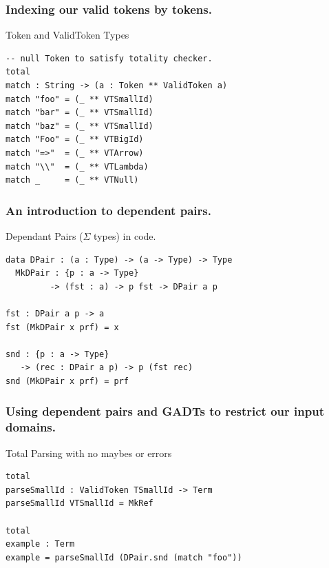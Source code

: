 \documentclass
  [hyperref={colorlinks = true,linkcolor = blue, 
             citecolor = blue, urlcolor = blue}
  ]{beamer}
\begin{document}
\begin{frame}[fragile]
\frametitle{Indexing our valid tokens by tokens.}
\begin{block}{Token and ValidToken Types}
\begin{verbatim}
-- null Token to satisfy totality checker.
total
match : String -> (a : Token ** ValidToken a)
match "foo" = (_ ** VTSmallId)
match "bar" = (_ ** VTSmallId)
match "baz" = (_ ** VTSmallId)
match "Foo" = (_ ** VTBigId)
match "=>"  = (_ ** VTArrow)
match "\\"  = (_ ** VTLambda)
match _     = (_ ** VTNull)
\end{verbatim}
\end{block}
\end{frame}

\begin{frame}[fragile]
\frametitle{An introduction to dependent pairs.}
\begin{block}{Dependant Pairs ($\Sigma$ types) in code.}
\begin{verbatim}
data DPair : (a : Type) -> (a -> Type) -> Type
  MkDPair : {p : a -> Type}
         -> (fst : a) -> p fst -> DPair a p

fst : DPair a p -> a
fst (MkDPair x prf) = x

snd : {p : a -> Type}
   -> (rec : DPair a p) -> p (fst rec)
snd (MkDPair x prf) = prf
\end{verbatim}
\end{block}
\end{frame}

\begin{frame}[fragile]
\frametitle{Using dependent pairs and GADTs to restrict our
input domains.}
\begin{block}{Total Parsing with no maybes or errors}
\begin{verbatim}
total
parseSmallId : ValidToken TSmallId -> Term
parseSmallId VTSmallId = MkRef

total 
example : Term
example = parseSmallId (DPair.snd (match "foo"))
\end{verbatim}
\end{block}
\end{frame}
\end{document}
